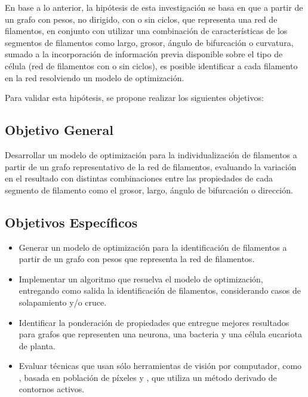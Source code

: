\begin{intro}
En base a lo anterior, la hip\'otesis de esta investigaci\'on se basa en que a partir de un grafo con pesos, no dirigido, con o sin ciclos, que representa una red de filamentos, en conjunto con utilizar una combinaci\'on de caracter\'isticas de los segmentos de filamentos como largo, grosor, \'angulo de bifurcaci\'on o curvatura, sumado a la incorporaci\'on de informaci\'on previa disponible sobre el tipo de c\'elula (red de filamentos con o sin ciclos), es posible identificar a cada filamento en la red resolviendo un modelo de optimizaci\'on.

Para validar esta hip\'otesis, se propone realizar los siguientes objetivos:
\subsection*{Objetivo General}
Desarrollar un modelo de optimizaci\'on para la individualizaci\'on de filamentos a partir de un grafo representativo de la red de filamentos, evaluando la variaci\'on en el resultado con distintas combinaciones entre las propiedades de cada segmento de filamento como el grosor, largo, \'angulo de bifurcaci\'on o direcci\'on.

\subsection*{Objetivos Espec\'ificos}
\begin{itemize}
    \item Generar un modelo de optimizaci\'on para la identificaci\'on de filamentos a partir de un grafo con pesos que representa la red de filamentos.
    \item Implementar un algoritmo que resuelva el modelo de optimizaci\'on, entregando como salida la identificaci\'on de filamentos, considerando casos de solapamiento y/o cruce.
    \item Identificar la ponderaci\'on de propiedades que entregue mejores resultados para grafos que representen una neurona, una bacteria y una c\'elula eucariota de planta.
    \item Evaluar t\'ecnicas que usan s\'olo herramientas de visi\'on por computador, como \cite{boudaoud2014fibriltool}, basada en poblaci\'on de p\'ixeles y \cite{xu2015soax}, que utiliza un m\'etodo derivado de contornos activos. 
    
\end{itemize}


\end{intro}
